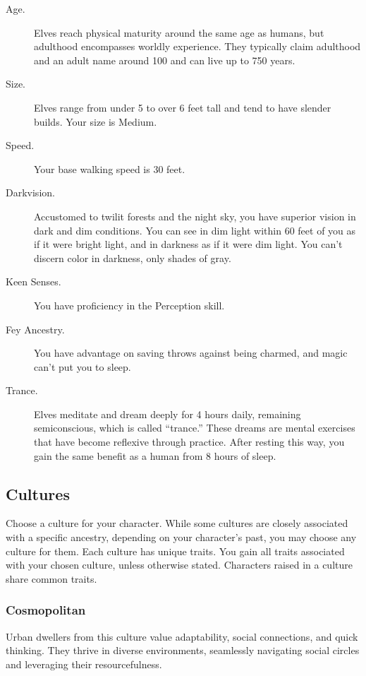 \begin{description}
\item[Age.]
Elves reach physical maturity around the same age as humans, but
adulthood encompasses worldly experience. They typically claim adulthood
and an adult name around 100 and can live up to 750 years.
\item[Size.]
Elves range from under 5 to over 6 feet tall and tend to have slender
builds. Your size is Medium.
\item[Speed.]
Your base walking speed is 30 feet.
\item[Darkvision.]
Accustomed to twilit forests and the night sky, you have superior vision
in dark and dim conditions. You can see in dim light within 60 feet of
you as if it were bright light, and in darkness as if it were dim light.
You can't discern color in darkness, only shades of gray.
\item[Keen Senses.]
You have proficiency in the Perception skill.
\item[Fey Ancestry.]
You have advantage on saving throws against being charmed, and magic
can't put you to sleep.
\item[Trance.]
Elves meditate and dream deeply for 4 hours daily, remaining
semiconscious, which is called ``trance.'' These dreams are mental
exercises that have become reflexive through practice. After resting
this way, you gain the same benefit as a human from 8 hours of sleep.
\end{description}

\subsection{Cultures}\label{_cultures}

Choose a culture for your character. While some cultures are closely
associated with a specific ancestry, depending on your character's past,
you may choose any culture for them. Each culture has unique traits. You
gain all traits associated with your chosen culture, unless otherwise
stated. Characters raised in a culture share common traits.

\subsubsection{Cosmopolitan}\label{culture-cosmopolitan}

Urban dwellers from this culture value adaptability, social connections,
and quick thinking. They thrive in diverse environments, seamlessly
navigating social circles and leveraging their resourcefulness.

